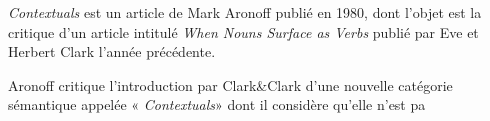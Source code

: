 \documentclass[a4paper,12pt]{article}
\author{Arthur Lapraye}
\begin{document}
 
 \maketitle
 
 \textit{Contextuals} est un article de Mark Aronoff publié en 1980, dont l'objet est la critique d'un article intitulé 
 \textit{When Nouns Surface as Verbs} publié par Eve et Herbert Clark l'année précédente. 
 
 Aronoff critique l'introduction par Clark&Clark d'une nouvelle catégorie sémantique appelée « \textit{Contextuals}» dont il considère qu'elle n'est pa
 
 
  
\end{document}
